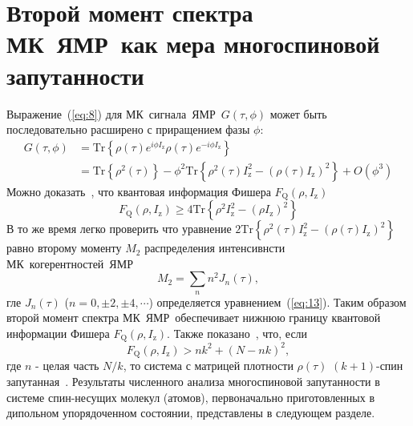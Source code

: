 \documentclass[utf8]{jetp}
\begin{document}
\section{Второй момент спектра МК~ЯМР~как мера многоспиновой запутанности}
\label{sec:4}

Выражение~(\ref{eq:8}) для МК~сигнала~ЯМР~$G(\tau,\phi)$ может быть последовательно расширено с приращением фазы $\phi$:
%
\begin{equation}
  \begin{split}
    \label{eq:17}
    G(\tau,\phi)
    & = \mathrm{Tr} \left\{
      \rho(\tau) e^{i \phi I_\mathrm{z} }
      \rho(\tau) e^{-i\phi I_\mathrm{z}}
    \right\} \\
    & = \mathrm{Tr} \left\{ \rho^2(\tau) \right\}
    - \phi^2 \mathrm{Tr} \left\{
      \rho^2(\tau) I^2_\mathrm{z}
      - (\rho(\tau) I_\mathrm{z})^2
    \right\}
    + O(\phi^3)
  \end{split}
\end{equation}
%
Можно доказать~\cite{Girolami_2017}, что квантовая информация Фишера $F_\mathrm{Q}(\rho,I_\mathrm{z})$~\cite{Helstrom_1976}
%
\begin{equation}
  \label{eq:18}
  F_\mathrm{Q}(\rho,I_\mathrm{z}) \geq 4 \mathrm{Tr} \left\{ \rho^2 I^2_\mathrm{z} - (\rho I_\mathrm{z})^2 \right\}
\end{equation}
%
В то же время легко проверить что уравнение $2 \mathrm{Tr} \left\{ \rho^2(\tau) I_\mathrm{z}^2 - \left( \rho(\tau) I_\mathrm{z} \right)^2 \right\}$ равно второму моменту $M_2$ распределения интенсивнсти МК~когерентностей~ЯМР~\cite{Khitrin_1997}
%
\begin{equation}
  \label{eq:19}
  M_2 = \sum_{n} n^2 J_n (\tau) ,
\end{equation}
%
гле $J_n(\tau)$ ($n=0,\pm 2, \pm 4, \cdots$) определяется уравнением~(\ref{eq:13}).
Таким образом второй момент спектра МК~ЯМР~обеспечивает нижнюю границу квантовой информации Фишера $F_\mathrm{Q}(\rho,I_\mathrm{z})$.
Также показано~\cite{T_th_2014,Pezz__2018}, что, если
%
\begin{equation}
  \label{eq:20}
  F_\mathrm{Q} (\rho,I_\mathrm{z}) > n k^2 + (N - n k)^2,
\end{equation}
%
где $n$ - целая часть ${N/k}$, то система с матрицей плотности $\rho(\tau)$ $(k+1)$-спин запутанная~\cite{Pezz__2009,Hyllus_2012,T_th_2012}.
Результаты численного анализа многоспиновой запутанности в системе спин-несущих молекул (атомов), первоначально приготовленных в дипольном упорядоченном состоянии, представлены в следующем разделе.
\end{document}
